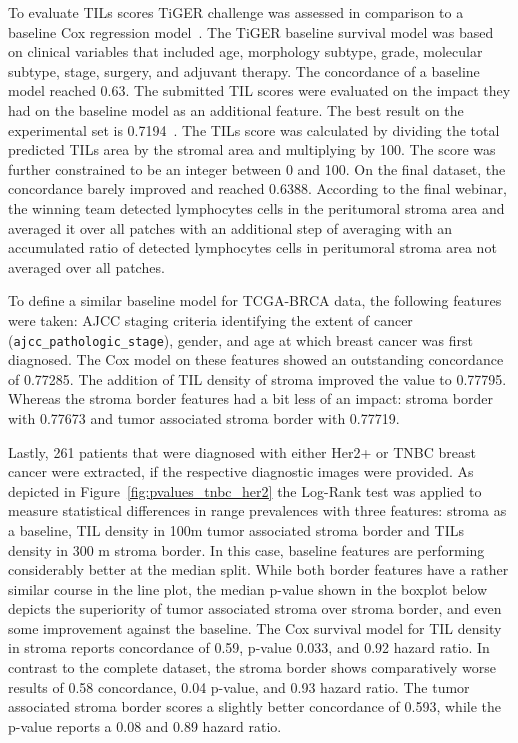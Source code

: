 To evaluate TILs scores TiGER challenge was assessed in comparison to a baseline Cox regression model~\cite{home}.
The TiGER baseline survival model was based on clinical variables that included age, morphology subtype, grade, molecular subtype, stage, surgery, and adjuvant therapy. The concordance of a baseline model reached 0.63. The submitted TIL scores were evaluated on the impact they had on the baseline model as an additional feature. The best result on the experimental set is 0.7194~\cite{shephard2022tiager}.
The TILs score was calculated by dividing the total predicted TILs area by the stromal area and multiplying by 100.
The score was further constrained to be an integer between 0 and 100.
On the final dataset, the concordance barely improved and reached 0.6388. According to the final webinar, the winning team detected lymphocytes cells in the peritumoral stroma area and averaged it over all patches with an additional step of averaging with an accumulated ratio of detected lymphocytes cells in peritumoral stroma area not averaged over all patches.

To define a similar baseline model for TCGA-BRCA data, the following features were taken: AJCC staging criteria identifying the extent of cancer (\verb+ajcc_pathologic_stage+), gender, and age at which breast cancer was first diagnosed. The Cox model on these features showed an outstanding concordance of 0.77285. The addition of TIL density of stroma improved the value to 0.77795.
Whereas the stroma border features had a bit less of an impact: stroma border with 0.77673 and tumor associated stroma border with 0.77719.

Lastly, 261 patients that were diagnosed with either Her2+ or TNBC breast cancer were extracted, if the respective diagnostic images were provided. As depicted in Figure~\ref*{fig:pvalues_tnbc_her2} the Log-Rank test was applied to measure statistical differences in range prevalences with three features: stroma as a baseline, TIL density in 100\textmu m tumor associated stroma border and TILs density in 300 \textmu m stroma border.
In this case, baseline features are performing considerably better at the median split. While both border features have a rather similar course in the line plot, the median p-value shown in the boxplot below depicts the superiority of tumor associated stroma over stroma border, and 
even some improvement against the baseline. The Cox survival model for TIL density in stroma reports concordance of 0.59, p-value 0.033, and 0.92 hazard ratio. In contrast to the complete dataset, the stroma border shows comparatively worse results of 0.58 concordance, 0.04 p-value, and 0.93 hazard ratio.
The tumor associated stroma border scores a slightly better concordance of 0.593, while the p-value reports a 0.08 and 0.89 hazard ratio.


